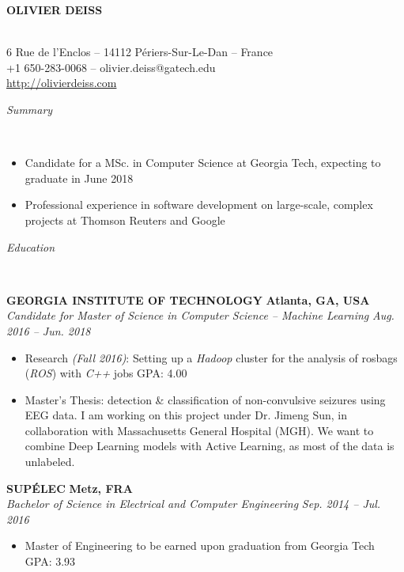 \documentclass[a4paper, 12pt]{article}
\newcommand{\marginline}{-0.3cm}
\newcommand{\margincontent}{-0.6cm}
\newcommand{\margincontentnotextbefore}{-0.3cm}
\newcommand{\marginbeforesection}{0.25cm}
\newcommand{\linewidthperso}{0.02cm}
\newcommand{\styletitle}[1]{\textbf{#1}}
\newcommand{\styledesc}[1]{\textit{#1}}
\newcommand{\styleloc}[1]{\textbf{#1}}
\newcommand{\styledates}[1]{\textit{#1}}
\newcommand{\stylesection}[1]{
  \vspace{\marginbeforesection}
  \begin{normalsize}\textit{#1}\end{normalsize}
  \vspace{\marginline}\\
  \noindent\makebox[\linewidth]{\rule{\textwidth}{\linewidthperso}}

}
\begin{document}
\begin{footnotesize}

\begin{center}
  \begin{small}\textbf{OLIVIER DEISS}\end{small}\\
  6 Rue de l'Enclos -- 14112 P\'eriers-Sur-Le-Dan -- France\\
  +1 650-283-0068 -- olivier.deiss@gatech.edu\\
  \url{http://olivierdeiss.com}
\end{center}

\stylesection{Summary}

\vspace{\margincontentnotextbefore}
\begin{itemize}
  \item Candidate for a MSc. in Computer Science at Georgia Tech, expecting to graduate in June 2018
  \item Professional experience in software development on large-scale, complex projects at Thomson Reuters and Google
\end{itemize}

\stylesection{Education}

\styletitle{GEORGIA INSTITUTE OF TECHNOLOGY} \hfill \styleloc{Atlanta, GA, USA}\\
\styledesc{Candidate for Master of Science in Computer Science -- Machine Learning} \hfill \styledates{Aug. 2016 -- Jun. 2018}\\
\vspace{\margincontent}
\begin{itemize}
  \item Research \textit{(Fall 2016)}: Setting up a \textit{Hadoop} cluster for the analysis of rosbags (\textit{ROS}) with \textit{C++} jobs \hfill GPA: 4.00
  \item Master's Thesis: detection \& classification of non-convulsive seizures using EEG data. I am working on this project under Dr. Jimeng Sun, in collaboration with Massachusetts General Hospital (MGH). We want to combine Deep Learning models with Active Learning, as most of the data is unlabeled.
\end{itemize}

\styletitle{SUP\'ELEC} \hfill \styleloc{Metz, FRA}\\
\styledesc{Bachelor of Science in Electrical and Computer Engineering} \hfill \styledates{Sep. 2014 -- Jul. 2016}\\
\vspace{\margincontent}
\begin{itemize}
  \item Master of Engineering to be earned upon graduation from Georgia Tech \hfill GPA: 3.93
\end{itemize}


\end{footnotesize}
\end{document}
